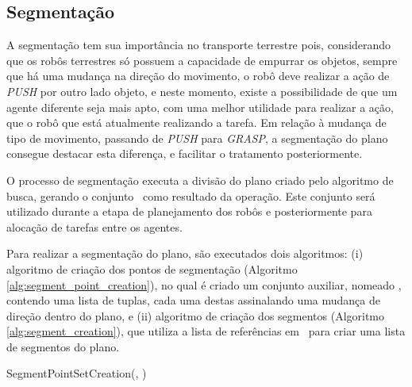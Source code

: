 
\subsection{Segmentação} %
\label{sub:segmenta_o}

A segmentação tem sua importância no transporte terrestre pois, considerando que os robôs terrestres só possuem a capacidade de empurrar os objetos, sempre que há uma mudança na direção do movimento, o robô deve realizar a ação de \emph{PUSH} por outro lado objeto, e neste momento, existe a possibilidade de que um agente diferente seja mais apto, com uma melhor utilidade para realizar a ação, que o robô que está atualmente realizando a tarefa.
Em relação à mudança de tipo de movimento, passando de \emph{PUSH} para \emph{GRASP}, a segmentação do plano consegue destacar esta diferença, e facilitar o tratamento posteriormente.

O processo de segmentação executa a divisão do plano  criado pelo algoritmo de busca, gerando o conjunto \ como resultado da operação.
Este conjunto será utilizado durante a etapa de planejamento dos robôs e posteriormente para alocação de tarefas entre os agentes.

Para realizar a segmentação do plano, são executados dois algoritmos:
(i) algoritmo de criação dos pontos de segmentação (Algoritmo \ref{alg:segment_point_creation}), no qual é criado um conjunto auxiliar, nomeado \segmentpointset, contendo uma lista de tuplas, cada uma destas assinalando uma mudança de direção dentro do plano, e
(ii) algoritmo de criação dos segmentos (Algoritmo \ref{alg:segment_creation}), que utiliza a lista de referências em \segmentpointset\ para criar uma lista de segmentos do plano.

\begin{algorithm}
  \caption[SegmentPointSetCreation]{SegmentPointSetCreation(, \segmentpointset)}
  \label{alg:segment_point_creation}

  \begin{algorithmic}[1]


    \ENDIF


    \ENDIF
  \ENDFOR

  \RETURN{\segmentpointset}

  \end{algorithmic}
\end{algorithm}

